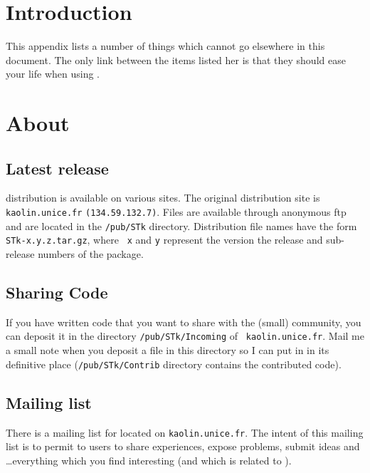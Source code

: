 %
%
%

\section{Introduction}
This appendix lists a number of things which cannot go elsewhere in this
document. The only link between the items listed her is that they should
ease your life when using {\stk}. 

\section{About \stk}

\subsection{Latest release}

{\stk} distribution is available on various sites. The original distribution
site is {\tt kaolin.unice.fr} {\tt (134.59.132.7)}. Files are available
through anonymous ftp and are located in the {\tt /pub/STk}
directory. Distribution file names have the form {\tt STk-x.y.z.tar.gz}, where {\tt
x} and {\tt y} represent the version the release and sub-release numbers of the package. 


\subsection{Sharing Code}

If you have written code that you want to share with the (small) {\stk}
community, you can deposit it in the directory {\tt /pub/STk/Incoming} of {\tt
kaolin.unice.fr}. Mail me a small note when you deposit a file in this
directory so I can put in in its definitive place ({\tt /pub/STk/Contrib} 
directory contains the contributed code).

\subsection{{\stk} Mailing list}

There is a mailing list for {\stk} located on {\tt kaolin.unice.fr}.  The
intent of this mailing list is to permit to {\stk} users to share experiences,
expose problems, submit ideas and \ldots everything which you find interesting
(and which is related to \stk).

